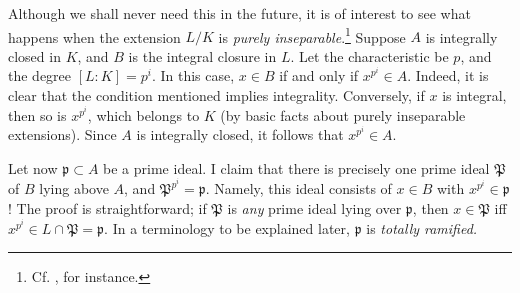 \begin{remark} Although we shall never need this in the future, it is of
interest to see what happens when the extension $L/K$ is \emph{purely
inseparable}.\footnote{Cf. \cite{La02}, for instance.}  Suppose $A$ is integrally closed in $K$, and $B$ is the integral closure in $L$.  Let the characteristic be $p$, and the degree $[L:K] = p^i$.
In this case, $x \in B$  if and only if $x^{p^i} \in A$. Indeed, it is clear that the condition mentioned implies integrality.  Conversely, if $x$ is integral, then so is $x^{p^i}$, which belongs to $K$ (by basic facts about purely inseparable extensions).  Since $A$ is integrally closed, it follows that $x^{p^i} \in A$.

Let now $\mathfrak{p} \subset A$ be a prime ideal.  I claim that there is precisely one prime ideal $\mathfrak{P}$ of $B$ lying above $A$, and $\mathfrak{P}^{p^i} = \mathfrak{p}$.  Namely, this ideal consists of $x \in B$ with $x^{p^i} \in \mathfrak{p}$!  The proof is straightforward; if $\mathfrak{P}$ is \emph{any} prime ideal lying over $\mathfrak{p}$, then $x \in \mathfrak{P}$ iff $x^{p^i} \in L \cap \mathfrak{P} = \mathfrak{p}$.   In a terminology to be explained later, $\mathfrak{p}$ is \emph{totally ramified.}
\end{remark}


